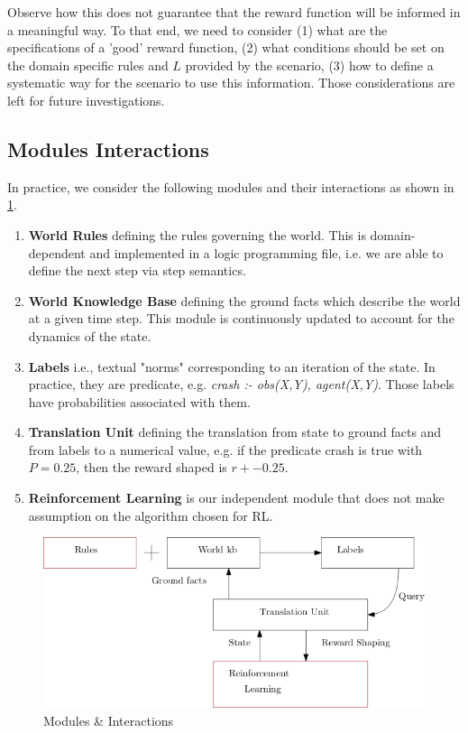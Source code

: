 \documentclass[a4paper,11pt]{article}
\theoremstyle{definition}
\begin{document}
Observe how this does not guarantee that the reward function will be informed in a meaningful way.
To that end, we need to consider (1) what are the specifications of a 'good' reward function, (2) what conditions should be set 
on the domain specific rules and $L$ provided by the scenario, (3) how to define a systematic way for the scenario to use 
this information. Those considerations are left for future investigations. 
 

\subsection{Modules Interactions}
In practice, we consider the following modules and their interactions as shown in \ref{fig:mods}.

\begin{enumerate}
  \item \textbf{World Rules} defining the rules governing the world. This is domain-dependent and implemented 
        in a logic programming file, i.e. we are able to define the next step via step semantics.
  \item \textbf{World Knowledge Base} defining the ground facts which describe the world at a given time step. This module is 
        continuously updated to account for the dynamics of the state. 
  \item \textbf{Labels} i.e., textual "norms" corresponding to an iteration of the state. In practice, they are predicate, e.g. \textit{crash :- obs(X,Y), agent(X,Y)}. 
                    Those labels have probabilities associated with them.
  \item \textbf{Translation Unit} defining the translation from state to ground facts and from labels to a numerical value, e.g. if the predicate crash is true with $P = 0.25$, then the reward shaped is $r + -0.25$. 
  \item \textbf{Reinforcement Learning} is our independent module that does not make assumption on the algorithm chosen for RL.
\end{enumerate}


\begin{figure}[H]
  \centering
  \includegraphics[scale=0.55]{dynamics.png}
  \caption{Modules \& Interactions}
  \label{fig:mods}
\end{figure}
\end{document}
